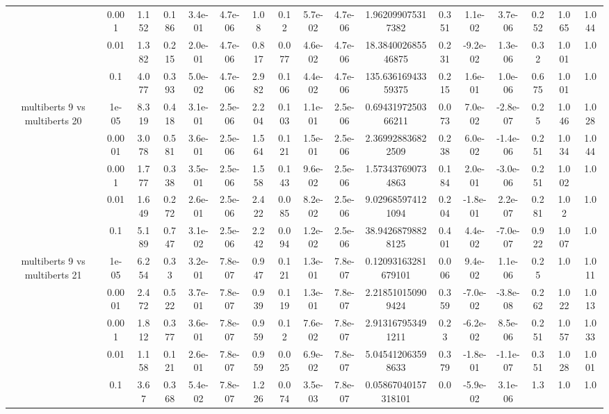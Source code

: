 \begin{tabular}{|c|c|c|c|c|c|c|c|c|c|c|c|c|c|c|c|c|}
 & 0.001 & 1.152 & 0.186 & 3.4e-01 & 4.7e-06 & 1.08 & 0.12 & 5.7e-02 & 4.7e-06 & 1.962099075317382 & 0.351 & 1.1e-02 & 3.7e-06 & 0.252 & 1.065 & 1.044 \\
 & 0.01 & 1.382 & 0.215 & 2.0e-01 & 4.7e-06 & 0.817 & 0.077 & 4.6e-02 & 4.7e-06 & 18.384002685546875 & 0.231 & -9.2e-02 & 1.3e-06 & 0.32 & 1.001 & 1.0 \\
 & 0.1 & 4.077 & 0.393 & 5.0e-02 & 4.7e-06 & 2.982 & 0.106 & 4.4e-02 & 4.7e-06 & 135.63616943359375 & 0.215 & 1.6e-01 & 1.0e-06 & 0.675 & 1.001 & 1.0 \\
\hline
\multirow{5}{*}{multiberts 9 vs multiberts 20} & 1e-05 & 8.319 & 0.418 & 3.1e-01 & 2.5e-06 & 2.204 & 0.103 & 1.1e-01 & 2.5e-06 & 0.6943197250366211 & 0.073 & 7.0e-02 & -2.8e-07 & 0.25 & 1.046 & 1.028 \\
 & 0.0001 & 3.078 & 0.581 & 3.6e-01 & 2.5e-06 & 1.564 & 0.121 & 1.5e-01 & 2.5e-06 & 2.369928836822509 & 0.238 & 6.0e-02 & -1.4e-06 & 0.251 & 1.034 & 1.044 \\
 & 0.001 & 1.777 & 0.338 & 3.5e-01 & 2.5e-06 & 1.558 & 0.143 & 9.6e-02 & 2.5e-06 & 1.573437690734863 & 0.184 & 2.0e-01 & -3.0e-06 & 0.251 & 1.002 & 1.0 \\
 & 0.01 & 1.649 & 0.272 & 2.6e-01 & 2.5e-06 & 2.422 & 0.085 & 8.2e-02 & 2.5e-06 & 9.029685974121094 & 0.204 & -1.8e-01 & 2.2e-07 & 0.281 & 1.02 & 1.0 \\
 & 0.1 & 5.189 & 0.747 & 3.1e-02 & 2.5e-06 & 2.242 & 0.094 & 1.2e-02 & 2.5e-06 & 38.94268798828125 & 0.401 & 4.4e-02 & -7.0e-07 & 0.922 & 1.007 & 1.0 \\
\hline
\multirow{5}{*}{multiberts 9 vs multiberts 21} & 1e-05 & 6.254 & 0.33 & 3.2e-01 & 7.8e-07 & 0.947 & 0.121 & 1.3e-01 & 7.8e-07 & 0.12093163281679101 & 0.006 & 9.4e-02 & 1.1e-06 & 0.25 & 1.0 & 1.011 \\
 & 0.0001 & 2.472 & 0.522 & 3.7e-01 & 7.8e-07 & 0.939 & 0.119 & 1.3e-01 & 7.8e-07 & 2.218510150909424 & 0.359 & -7.0e-02 & -3.8e-08 & 0.262 & 1.022 & 1.013 \\
 & 0.001 & 1.812 & 0.377 & 3.6e-01 & 7.8e-07 & 0.959 & 0.12 & 7.6e-02 & 7.8e-07 & 2.913167953491211 & 0.23 & -6.2e-02 & 8.5e-06 & 0.251 & 1.057 & 1.033 \\
 & 0.01 & 1.158 & 0.121 & 2.6e-01 & 7.8e-07 & 0.959 & 0.025 & 6.9e-02 & 7.8e-07 & 5.045412063598633 & 0.379 & -1.8e-01 & -1.1e-07 & 0.351 & 1.028 & 1.001 \\
 & 0.1 & 3.67 & 0.368 & 5.4e-02 & 7.8e-07 & 1.226 & 0.074 & 3.5e-03 & 7.8e-07 & 0.05867040157318101 & 0.0 & -5.9e-02 & 3.1e-06 & 1.3 & 1.0 & 1.0 \\

\end{tabular}
